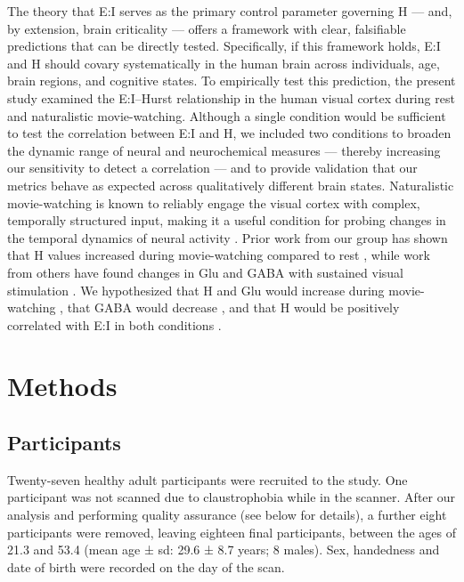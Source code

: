 \documentclass[
true
]{sn-jnl}
\begin{document}
The theory that E:I serves as the primary control parameter governing H
--- and, by extension, brain criticality --- offers a framework with
clear, falsifiable predictions that can be directly tested.
Specifically, if this framework holds, E:I and H should covary
systematically in the human brain across individuals, age, brain
regions, and cognitive states. To empirically test this prediction, the
present study examined the E:I--Hurst relationship in the human visual
cortex during rest and naturalistic movie-watching. Although a single
condition would be sufficient to test the correlation between E:I and H,
we included two conditions to broaden the dynamic range of neural and
neurochemical measures --- thereby increasing our sensitivity to detect
a correlation --- and to provide validation that our metrics behave as
expected across qualitatively different brain states. Naturalistic
movie-watching is known to reliably engage the visual cortex with
complex, temporally structured input, making it a useful condition for
probing changes in the temporal dynamics of neural activity
\citep{vanderwalMoviesMagnetNaturalistic2019, campbellFractalBasedAnalysisFMRI2022}.
Prior work from our group has shown that H values increased during
movie-watching compared to rest
\citep{campbellFractalBasedAnalysisFMRI2022}, while work from others
have found changes in Glu and GABA with sustained visual stimulation
\citep{linInvestigatingMetabolicChanges2012, martinez-maestroDynamicMetabolicChanges2019, saucedoChangesGABAGlutamate, kurcyusOppositeDynamicsGABA2018}.
We hypothesized that H and Glu would increase during movie-watching
\citep{campbellFractalBasedAnalysisFMRI2022, linInvestigatingMetabolicChanges2012, martinez-maestroDynamicMetabolicChanges2019},
that GABA would decrease
\citep{saucedoChangesGABAGlutamate, kurcyusOppositeDynamicsGABA2018},
and that H would be positively correlated with E:I in both conditions
\citep{gaoInferringSynapticExcitation2017}.

\section{Methods}\label{methods}

\subsection{Participants}\label{participants}

Twenty-seven healthy adult participants were recruited to the study. One
participant was not scanned due to claustrophobia while in the scanner.
After our analysis and performing quality assurance (see below for
details), a further eight participants were removed, leaving eighteen
final participants, between the ages of 21.3 and 53.4 (mean age ± sd:
29.6 ± 8.7 years; 8 males). Sex, handedness and date of birth were
recorded on the day of the scan.
\end{document}
